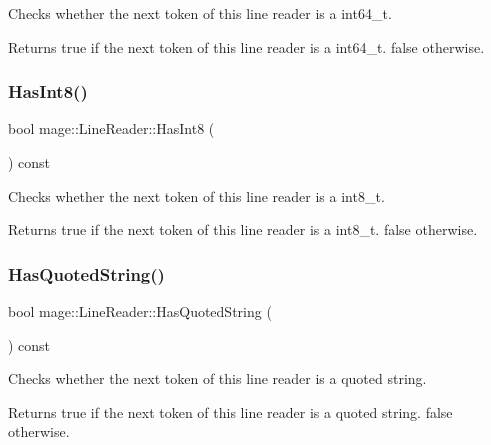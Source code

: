 Checks whether the next token of this line reader is a {\ttfamily int64\+\_\+t}.

\begin{DoxyReturn}{Returns}
{\ttfamily true} if the next token of this line reader is a {\ttfamily int64\+\_\+t}. {\ttfamily false} otherwise. 
\end{DoxyReturn}
\hypertarget{classmage_1_1_line_reader_a1eecd5324b2e212826c49e600cc46e1f}{}\label{classmage_1_1_line_reader_a1eecd5324b2e212826c49e600cc46e1f} 
\subsubsection{\texorpdfstring{Has\+Int8()}{HasInt8()}}
{\footnotesize\ttfamily bool mage\+::\+Line\+Reader\+::\+Has\+Int8 (\begin{DoxyParamCaption}{ }\end{DoxyParamCaption}) const\hspace{0.3cm}{\ttfamily [protected]}}

Checks whether the next token of this line reader is a {\ttfamily int8\+\_\+t}.

\begin{DoxyReturn}{Returns}
{\ttfamily true} if the next token of this line reader is a {\ttfamily int8\+\_\+t}. {\ttfamily false} otherwise. 
\end{DoxyReturn}
\hypertarget{classmage_1_1_line_reader_ac92de9a3d986c7031c902c9489cfaa5a}{}\label{classmage_1_1_line_reader_ac92de9a3d986c7031c902c9489cfaa5a} 
\subsubsection{\texorpdfstring{Has\+Quoted\+String()}{HasQuotedString()}}
{\footnotesize\ttfamily bool mage\+::\+Line\+Reader\+::\+Has\+Quoted\+String (\begin{DoxyParamCaption}{ }\end{DoxyParamCaption}) const\hspace{0.3cm}{\ttfamily [protected]}}

Checks whether the next token of this line reader is a quoted string.

\begin{DoxyReturn}{Returns}
{\ttfamily true} if the next token of this line reader is a quoted string. {\ttfamily false} otherwise. 
\end{DoxyReturn}
\hypertarget{classmage_1_1_line_reader_a011b5a0d1bd2d157033e3bf7d7323aed}{}\label{classmage_1_1_line_reader_a011b5a0d1bd2d157033e3bf7d7323aed} 
